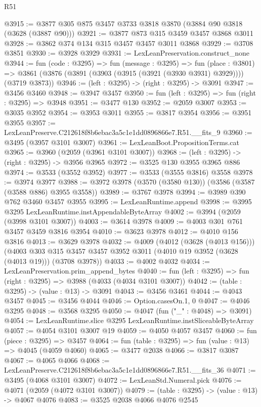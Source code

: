 \begin{lexlean}{R51}
\begin{coremodule}
@3915 := @3877 @305 @875 @3457 @3733 @3818 @3870 (@3884 @90 @3818 (@3628 (@3887 @90)))
@3921 := @3877 @873 @315 @3459 @3457 @3868 @3011
@3928 := @3862 @374 @134 @315 @3457 @3457 @3011 @3868
@3929 := @3708 @3851
@3930 := @3928 @3929
@3931 := LexLeanPreservation.construct_none
@3944 := fun (code : @3295) =>
  fun (message : @3295) =>
  fun (place : @3801) =>
  @3861 (@3876 (@3891 (@3903 (@3915 (@3921 (@3930 @3931) @3929)))) (@3719 @3873))
@3946 := (left : @3295) -> (right : @3295) -> @3091
@3947 := @3456 @3460
@3948 := @3947 @3457
@3950 := fun (left : @3295) => fun (right : @3295) => @3948
@3951 := @3477 @130
@3952 := @2059 @3007
@3953 := @3035 @3952
@3954 := @3953 @3011
@3955 := @3817 @3954
@3956 := @3951 @3955
@3957 := LexLeanPreserve.C212618f8b6ebac3a5c1e1dd0896866e7.R51.__fits_9
@3960 := @3495 (@3957 @3101 @3007)
@3961 := LexLeanBoot.PropositionTerms.cat
@3965 := @3960 (@2059 (@3961 @3101 @3007))
@3968 := (left : @3295) -> (right : @3295) -> @3956 @3965
@3972 := @3525 @130 @3955 @3965 @886
@3974 := @3533 (@3552 @3952)
@3977 := @3533 (@3555 @3816) @3558
@3978 := @3974 @3977
@3988 := @3972 @3978 (@3570 (@3580 @130)) (@3586 (@3587 (@3588 @886) @3955 @3558))
@3989 := @3767 @3978
@3994 := @3989 @390 @762 @3460 @3457 @3955
@3995 := LexLeanRuntime.append
@3998 := @3995 @3295 LexLeanRuntime.instAppendableByteArray
@4002 := @3994 (@2059 (@3998 @3101 @3007))
@4003 := @3614 @3978
@4009 := @4003 @301 @761 @3457 @3459 @3816 @3954
@4010 := @3623 @3978
@4012 := @4010 @156 @3816
@4013 := @3629 @3978
@4032 := @4009
    (@4012 (@3628 (@4013 @156)))
    (@4003 @303 @315 @3457 @3457 @3952 @3011 (@4010 @19 @3952 (@3628 (@4013 @19))) (@3708 @3978))
@4033 := @4002 @4032
@4034 := LexLeanPreservation.prim_append_bytes
@4040 := fun (left : @3295) => fun (right : @3295) => @3988 (@4033 (@4034 @3101 @3007))
@4042 := (table : @3295) -> (value : @13) -> @3091
@4043 := @3456 @3461
@4044 := @4043 @3457
@4045 := @3456 @4044
@4046 := Option.casesOn.{1, 0}
@4047 := @4046 @3295
@4048 := @3568 @3295
@4050 := @4047 (fun ("_" : @4048) => @3091)
@4054 := LexLeanRuntime.slice @3295 LexLeanRuntime.instSliceableByteArray
@4057 := @4054 @3101 @3007 @19
@4059 := @4050 @4057 @3457
@4060 := fun (piece : @3295) => @3457
@4064 := fun (table : @3295) => fun (value : @13) => @4045 (@4059 @4060)
@4065 := @3477 @2038
@4066 := @3817 @3087
@4067 := @4065 @4066
@4068 := LexLeanPreserve.C212618f8b6ebac3a5c1e1dd0896866e7.R51.__fits_36
@4071 := @3495 (@4068 @3101 @3007)
@4072 := LexLeanStd.Numeral.pick
@4076 := @4071 (@2059 (@4072 @3101 @3007))
@4079 := (table : @3295) -> (value : @13) -> @4067 @4076
@4083 := @3525 @2038 @4066 @4076 @2545

\end{coremodule}
\end{lexlean}

